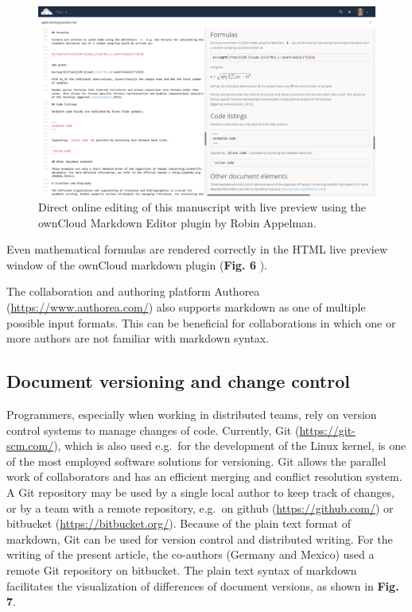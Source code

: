 \documentclass[10pt,fleqn]{wlpeerj}
\begin{document}
\begin{figure}[htbp]
\centering
\includegraphics{fig-owncloud-md-editor.png}
\caption{Direct online editing of this manuscript with live preview
using the ownCloud Markdown Editor plugin by Robin Appelman.}
\end{figure}

Even mathematical formulas are rendered correctly in the HTML live
preview window of the ownCloud markdown plugin (\textbf{Fig. 6} ).

The collaboration and authoring platform Authorea
(\url{https://www.authorea.com/}) also supports markdown as one of
multiple possible input formats. This can be beneficial for
collaborations in which one or more authors are not familiar with
markdown syntax.

\subsection{Document versioning and change
control}\label{document-versioning-and-change-control}

Programmers, especially when working in distributed teams, rely on
version control systems to manage changes of code. Currently, Git
(\url{https://git-scm.com/}), which is also used e.g.~for the
development of the Linux kernel, is one of the most employed software
solutions for versioning. Git allows the parallel work of collaborators
and has an efficient merging and conflict resolution system. A Git
repository may be used by a single local author to keep track of
changes, or by a team with a remote repository, e.g.~on github
(\url{https://github.com/}) or bitbucket (\url{https://bitbucket.org/}).
Because of the plain text format of markdown, Git can be used for
version control and distributed writing. For the writing of the present
article, the co-authors (Germany and Mexico) used a remote Git
repository on bitbucket. The plain text syntax of markdown facilitates
the visualization of differences of document versions, as shown in
\textbf{Fig. 7}.
\end{document}
